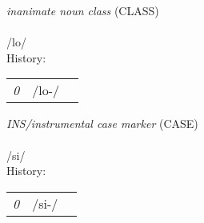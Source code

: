 \vspace{15pt}
\begin{nopagebreak}
 \textit{inanimate noun class} (CLASS)\\
\\
\noindent /l{\textprimstress}o/\\


\noindent History:

\vspace{-0pt}
\hspace{40pt}
\begin{tabular}{ccc}
\textit{0} & /lo-/& \\
\end{tabular}

\vspace{20pt}\hline

\end{nopagebreak}
\filbreak



\vspace{15pt}
\begin{nopagebreak}
 \textit{INS/instrumental case marker} (CASE)\\
\\
\noindent /s{\textprimstress}i/\\


\noindent History:

\vspace{-0pt}
\hspace{40pt}
\begin{tabular}{ccc}
\textit{0} & /si-/& \\
\end{tabular}

\vspace{20pt}\hline

\end{nopagebreak}
\filbreak



